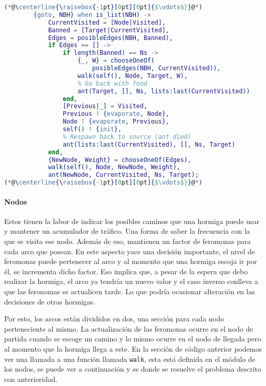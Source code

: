 \documentclass[
12pt, %
letterpaper, %
oneside, %
headinclude,footinclude, %
BCOR5mm, %
]{scrartcl}
\begin{document}
\begin{lstlisting}[language=Erlang]
(*@\centerline{\raisebox{-1pt}[0pt][0pt]{$\vdots$}}@*)
        {goto, NBH} when is_list(NBH) ->
            CurrentVisited = [Node|Visited],
            Banned = [Target|CurrentVisited],
            Edges = posibleEdges(NBH, Banned),
            if Edges == [] ->
                if length(Banned) == Ns ->
                    {_, W} = chooseOneOf(
                        posibleEdges(NBH, CurrentVisited)),
                    walk(self(), Node, Target, W),
                    % Go back with food
                    ant(Target, [], Ns, lists:last(CurrentVisited))
                end,
                [Previous|_] = Visited,
                Previous ! {evaporate, Node},
                Node ! {evaporate, Previous},
                self() ! {init},
                % Respawn back to source (ant died)
                ant(lists:last(CurrentVisited), [], Ns, Target)
            end,
            {NewNode, Weight} = chooseOneOf(Edges),
            walk(self(), Node, NewNode, Weight),
            ant(NewNode, CurrentVisited, Ns, Target);
(*@\centerline{\raisebox{-1pt}[0pt][0pt]{$\vdots$}}@*)
\end{lstlisting}

\paragraph{Nodos}

Estos tienen la labor de indicar los posibles caminos que una hormiga puede usar y mantener un acumulador de tráfico. Una forma de saber la frecuencia con la que se visita ese nodo. Además de eso, mantienen un factor de feromonas para cada arco que posean. En este aspecto yace una decisión importante, el nivel de feromonas puede pertenecer al arco y al momento que una hormiga escoja ir por él, se incrementa dicho factor. Eso implica que, a pesar de la espera que debo realizar la hormiga, el arco ya tendría un nuevo valor y el caso inverso conlleva a que las feronomas se actualicen tarde. Lo que podría ocasionar alteración en las decisiones de otras hormigas.

Por esto, los arcos están divididos en dos, una sección para cada nodo perteneciente al mismo. La actualización de las feromonas ocurre en el nodo de partida cuando se escoge un camino y lo mismo ocurre en el nodo de llegada pero al momento que la hormiga llega a este. En la sección de código anterior podemos ver una llamada a una función llamada \texttt{walk}, esta está definida en el módulo de los nodos, se puede ver a continuación y es donde se resuelve el problema descrito con anterioridad.
\end{document}
